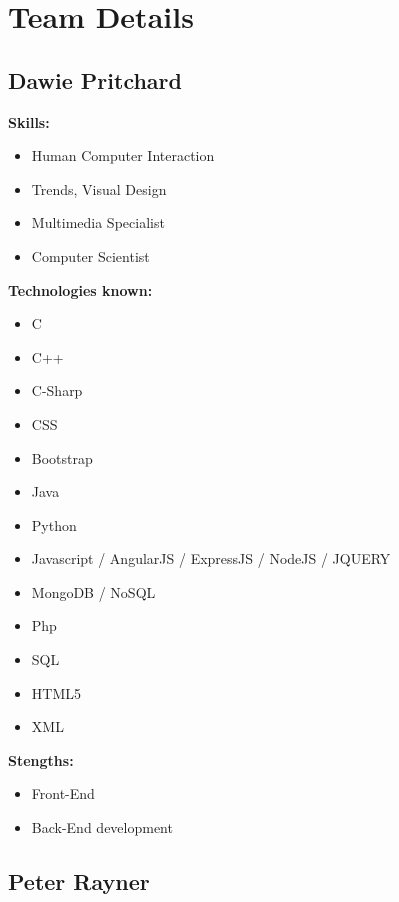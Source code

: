 \documentclass{article}
\begin{document}
\section{Team Details}
\subsection{Dawie Pritchard}
\textbf{Skills:}
\begin{itemize}
 	\item Human Computer Interaction
 	\item Trends, Visual Design 
 	\item Multimedia Specialist
 	\item Computer Scientist
\end {itemize}
\textbf{Technologies known:}
\begin{itemize}
	\item C
 	\item C++
 	\item C-Sharp
 	\item CSS
 	\item Bootstrap
 	\item Java
 	\item Python
 	\item Javascript / AngularJS / ExpressJS / NodeJS / JQUERY
 	\item MongoDB / NoSQL
 	\item Php
 	\item SQL
 	\item HTML5
 	\item XML
 \end{itemize}
\textbf{Stengths:} 
\begin{itemize}
	\item Front-End
	\item Back-End development
\end{itemize}

\newpage
\subsection {Peter Rayner}
\end{document}
